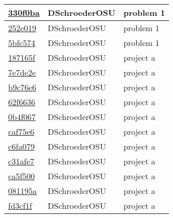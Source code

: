 \documentclass[10pt,letterpaper,draftclsnofoot,onecolumn]{IEEEtran}
\begin{document}
\begin{tabular}{l l l}
\href{https://github.com/DSchroederOSU/CS444-Group\_11\_05/commit/330f0ba4b5d0d019425bd2d4a1b873791160375b}{330f0ba} & DSchroederOSU & problem 1\\\hline
\href{https://github.com/DSchroederOSU/CS444-Group\_11\_05/commit/252e019b3dd0ffc47343228644947c08a34c87fa}{252e019} & DSchroederOSU & problem 1\\\hline
\href{https://github.com/DSchroederOSU/CS444-Group\_11\_05/commit/5bfc574d7001e12ee9e38f94af6cf4060d922f89}{5bfc574} & DSchroederOSU & problem 1\\\hline
\href{https://github.com/DSchroederOSU/CS444-Group\_11\_05/commit/187165fb52263e70d168f5b4ab7d6053b06c5ab1}{187165f} & DSchroederOSU & project a\\\hline
\href{https://github.com/DSchroederOSU/CS444-Group\_11\_05/commit/7e7de2e46e1dc5ba56fb48175135b9da3a11fd56}{7e7de2e} & DSchroederOSU & project a\\\hline
\href{https://github.com/DSchroederOSU/CS444-Group\_11\_05/commit/b9c76e60d132e01678f217dd7d75731153cd2789}{b9c76e6} & DSchroederOSU & project a\\\hline
\href{https://github.com/DSchroederOSU/CS444-Group\_11\_05/commit/62f6636452f5e79fa406da9e36033a5aa5fa2fb2}{62f6636} & DSchroederOSU & project a\\\hline
\href{https://github.com/DSchroederOSU/CS444-Group\_11\_05/commit/0b4f067ea9b3708cf1ee2262f26b6dbe3f6f186f}{0b4f067} & DSchroederOSU & project a\\\hline
\href{https://github.com/DSchroederOSU/CS444-Group\_11\_05/commit/caf75e635f99088e9322ece621a5ac513ec54aee}{caf75e6} & DSchroederOSU & project a\\\hline
\href{https://github.com/DSchroederOSU/CS444-Group\_11\_05/commit/c6fa079cc16d9bdf6042d21d120d646aa56e28fe}{c6fa079} & DSchroederOSU & project a\\\hline
\href{https://github.com/DSchroederOSU/CS444-Group\_11\_05/commit/c31afe74c2a1630ff2d309da222c39bb39b28085}{c31afe7} & DSchroederOSU & project a\\\hline
\href{https://github.com/DSchroederOSU/CS444-Group\_11\_05/commit/ca5f500f1667bfa17c33d79313a579c0ec6b2244}{ca5f500} & DSchroederOSU & project a\\\hline
\href{https://github.com/DSchroederOSU/CS444-Group\_11\_05/commit/081195ab2514157e391d38dde60aa0a590ca4d25}{081195a} & DSchroederOSU & project a\\\hline
\href{https://github.com/DSchroederOSU/CS444-Group\_11\_05/commit/fd3cf1f6984b4d2d8db99a1398706149b945a7f8}{fd3cf1f} & DSchroederOSU & project a\\\hline

\end{tabular}
\end{document}
